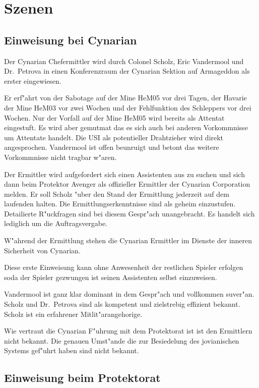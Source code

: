 \section{Szenen}

\subsection{Einweisung bei Cynarian}

Der Cynarian Chefermittler wird durch Colonel Scholz, Eric Vandermool und Dr.~Petrova in einen Konferenzraum der Cynarian Sektion auf Armageddon als erster eingewiesen.

Er erf"ahrt von der Sabotage auf der Mine HeM05 vor drei Tagen, der Havarie der Mine HeM03 vor zwei Wochen und der Fehlfunktion des Schleppers vor drei Wochen. Nur der Vorfall auf der Mine HeM05 wird bereits als Attentat eingestuft. Es wird aber gemutma\3t das es sich auch bei anderen Vorkommnisse um Attentate handelt. Die USI als potentieller Drahtzieher wird direkt angesprochen. Vandermool ist offen beunruigt und betont das weitere Vorkommnisse nicht tragbar w"aren.

Der Ermittler wird aufgefordert sich einen Assistenten aus zu suchen und sich dann beim Protektor Avenger als offizieller Ermittler der Cynarian Corporation melden. Er soll Scholz "uber den Stand der Ermittlung jederzeit auf dem laufenden halten. Die Ermittlungserkenntnisse sind als geheim einzustufen. Detailierte R"uckfragen sind bei diesem Gespr"ach unangebracht. Es handelt sich lediglich um die Auftragsvergabe.

W"ahrend der Ermittlung stehen die Cynarian Ermittler im Dienste der inneren Sicherheit von Cynarian.

\begin{remarks}
Diese erste Einweisung kann ohne Anwesenheit der restlichen Spieler erfolgen soda\3 der Spieler gezwungen ist seinen Assistenten selbst einzuweisen.

Vandermool ist ganz klar dominant in dem Gespr"ach und vollkommen suver"an. Scholz und Dr.~Petrova sind als kompetent und zielstrebig effizient bekannt. Scholz ist ein erfahrener Mitlit"arangehorige.

Wie vertraut die Cynarian F"uhrung mit dem Protektorat ist ist den Ermittlern nicht bekannt. Die genauen Umst"ande die zur Besiedelung des jovianischen Systems gef"uhrt haben sind nicht bekannt.
\end{remarks}

\subsection{Einweisung beim Protektorat}

